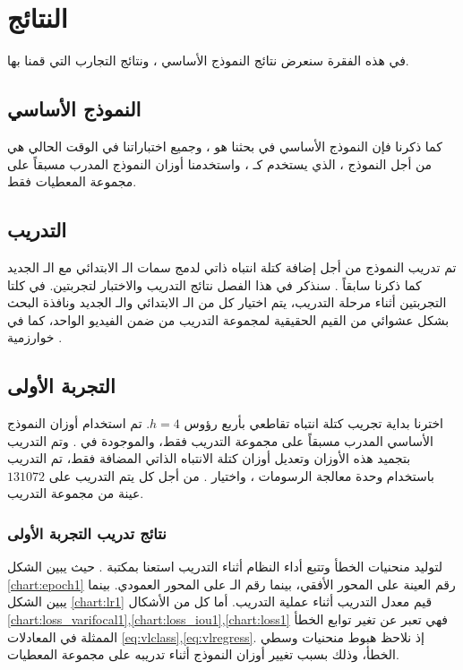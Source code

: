 \section{النتائج}
في هذه الفقرة سنعرض نتائج النموذج الأساسي 
،
ونتائج التجارب التي قمنا بها.
\subsection{النموذج الأساسي
}
كما ذكرنا فإن النموذج الأساسي في بحثنا هو
،
وجميع اختباراتنا في الوقت الحالي هي من أجل النموذج
،
الذي يستخدم 
كـ
،
واستخدمنا أوزان النموذج المدرب مسبقاً
على مجموعة المعطيات 
فقط.
\subsection{التدريب}
تم تدريب النموذج من أجل إضافة كتلة انتباه ذاتي لدمج سمات الـ 
الابتدائي مع الـ
الجديد كما ذكرنا سابقاً .
سنذكر في هذا الفصل نتائج التدريب والاختبار لتجربتين.
في كلتا التجربتين أثناء مرحلة التدريب، يتم اختيار كل من الـ 
الابتدائي والـ
الجديد ونافذة البحث بشكل عشوائي من القيم الحقيقية لمجموعة التدريب من ضمن الفيديو الواحد، كما في خوارزمية
.
\newline
\subsection{التجربة الأولى}
اخترنا بداية تجريب كتلة انتباه تقاطعي بأربع رؤوس
$h = 4$.
تم استخدام أوزان النموذج الأساسي المدرب مسبقاً على مجموعة التدريب 
فقط، والموجودة في 
.
وتم التدريب بتجميد هذه الأوزان وتعديل أوزان كتلة الانتباه الذاتي المضافة فقط، 
تم التدريب باستخدام وحدة معالجة الرسومات 
،
واختيار 
.
من أجل كل
يتم التدريب على 
$131072$ 
عينة من مجموعة التدريب.
\subsubsection{نتائج تدريب التجربة الأولى}
لتوليد منحنيات الخطأ وتتبع أداء النظام أثناء التدريب استعنا بمكتبة
.
حيث يبين الشكل 
\ref{chart:epoch1}
رقم العينة على المحور الأفقي، بينما رقم الـ
على المحور العمودي.
 بينما يبين الشكل 
\ref{chart:lr1}
قيم معدل التدريب 
أثناء عملية التدريب. 
\newline
أما كل من الأشكال
\ref{chart:loss_varifocal1},\ref{chart:loss_iou1},\ref{chart:loss1}
فهي تعبر عن تغير توابع الخطأ الممثلة في المعادلات
\ref{eq:vlclass},\ref{eq:vlregress}.
إذ نلاحظ هبوط منحنيات وسطي الخطأ، وذلك بسبب تغيير أوزان النموذج أثناء تدريبه على مجموعة المعطيات.

